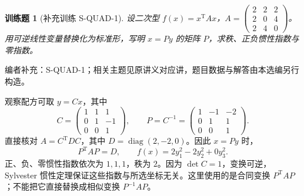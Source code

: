\documentclass[12pt,fontset=fandol]{ctexart}
\newtheorem{exercise}{训练题}[section]
\begin{document}
\begin{exercise}[补充训练 S-QUAD-1]\label{prob:S-QUAD-1}
设二次型 $f(x)=x^{\mathrm T}Ax$，$A=\begin{pmatrix}2&2&2\\2&0&4\\2&4&0\end{pmatrix}$。用可逆线性变量替换化为标准形，写明 $x=Py$ 的矩阵 $P$，求秩、正负惯性指数与零指数。
\end{exercise}
\noindent 编者补充：S-QUAD-1；相关主题见原讲义对应讲，题目数据与解答由本选编另行构造。
\begin{solve}
观察配方可取 $y=Cx$，其中
\[C=\begin{pmatrix}1&1&1\\0&1&-1\\0&0&1\end{pmatrix},\qquad P=C^{-1}=\begin{pmatrix}1&-1&-2\\0&1&1\\0&0&1\end{pmatrix}.\]
直接核对 $A=C^{\mathrm T}DC$，其中 $D=\operatorname{diag}(2,-2,0)$。因此 $x=Py$ 时，
\[P^{\mathrm T}AP=D,\qquad f(x)=2y_1^2-2y_2^2+0y_3^2.\]
正、负、零惯性指数依次为 $1,1,1$，秩为 $2$。因为 $\det C=1$，变换可逆，Sylvester 惯性定理保证这些指数与所选坐标无关。这里使用的是合同变换 $P^{\mathrm T}AP$；不能把它直接替换成相似变换 $P^{-1}AP$。
\end{solve}
\end{document}

